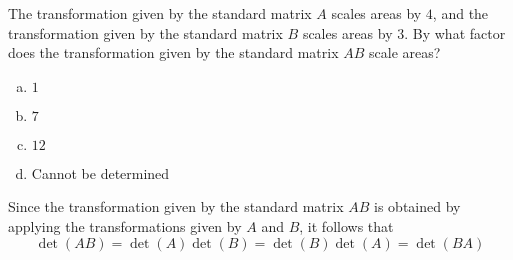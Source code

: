 \begin{activity}{5}
  The transformation given by the standard matrix \(A\) scales areas by
  \(4\), and the transformation given by the standard matrix \(B\) scales
  areas by \(3\). By what factor does the transformation given by the standard matrix
  \(AB\) scale areas?

\begin{center}
\end{center}

  \begin{enumerate}[(a)]
  \item \(1\)
  \item \(7\)
  \item \(12\)
  \item Cannot be determined
  \end{enumerate}
\end{activity}

\begin{fact}
Since the transformation given by the standard matrix \(AB\) is obtained
by applying the transformations given by \(A\) and \(B\), it follows that 
\[\det(AB)=\det(A)\det(B)=\det(B)\det(A)=\det(BA)\]
\end{fact}


